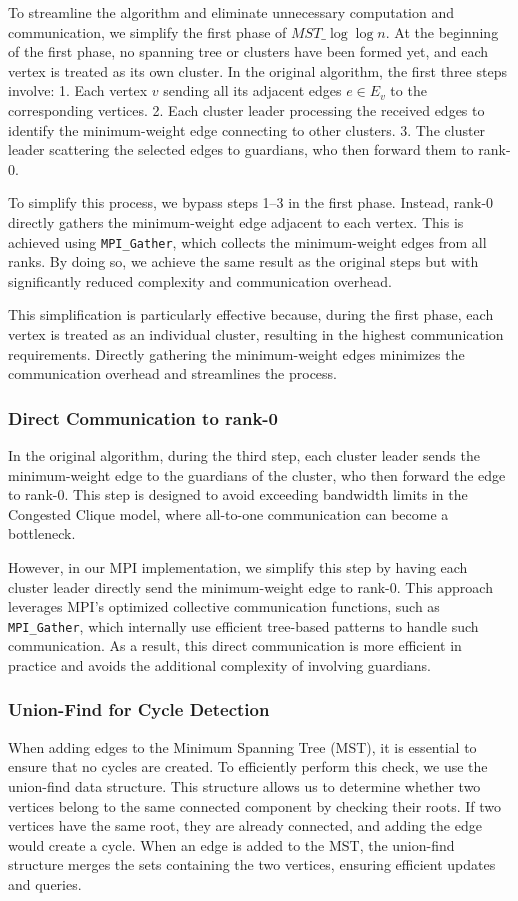 \documentclass[english, 12pt, a4paper, elec, utf8, a-2b, online]{aaltothesis}
\newcommand{\mstalgo}{$MST\_\log\log{n}$}
\begin{document}
To streamline the algorithm and eliminate unnecessary computation and communication, we simplify the first phase of \mstalgo{}. At the beginning of the first phase, no spanning tree or clusters have been formed yet, and each vertex is treated as its own cluster. In the original algorithm, the first three steps involve:
1. Each vertex \( v \) sending all its adjacent edges \( e \in E_v \) to the corresponding vertices.
2. Each cluster leader processing the received edges to identify the minimum-weight edge connecting to other clusters.
3. The cluster leader scattering the selected edges to guardians, who then forward them to rank-0.

To simplify this process, we bypass steps 1–3 in the first phase. Instead, rank-0 directly gathers the minimum-weight edge adjacent to each vertex. This is achieved using \texttt{MPI\_Gather}, which collects the minimum-weight edges from all ranks. By doing so, we achieve the same result as the original steps but with significantly reduced complexity and communication overhead.

This simplification is particularly effective because, during the first phase, each vertex is treated as an individual cluster, resulting in the highest communication requirements. Directly gathering the minimum-weight edges minimizes the communication overhead and streamlines the process.

\subsubsection{Direct Communication to rank-0}
In the original algorithm, during the third step, each cluster leader sends the minimum-weight edge to the guardians of the cluster, who then forward the edge to rank-0. This step is designed to avoid exceeding bandwidth limits in the Congested Clique model, where all-to-one communication can become a bottleneck.

However, in our MPI implementation, we simplify this step by having each cluster leader directly send the minimum-weight edge to rank-0. This approach leverages MPI's optimized collective communication functions, such as \texttt{MPI\_Gather}, which internally use efficient tree-based patterns to handle such communication. As a result, this direct communication is more efficient in practice and avoids the additional complexity of involving guardians.

\subsubsection{Union-Find for Cycle Detection}
When adding edges to the Minimum Spanning Tree (MST), it is essential to ensure that no cycles are created. To efficiently perform this check, we use the union-find data structure. This structure allows us to determine whether two vertices belong to the same connected component by checking their roots. If two vertices have the same root, they are already connected, and adding the edge would create a cycle. When an edge is added to the MST, the union-find structure merges the sets containing the two vertices, ensuring efficient updates and queries.
\end{document}
